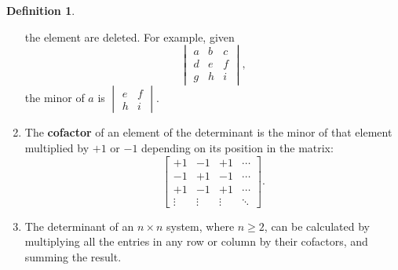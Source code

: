 \documentclass[a4paper,leqno]{article}
\numberwithin{equation}{section}
\theoremstyle{definition}
\newtheorem{defn}[equation]{Definition}
\theoremstyle{remark}
\newcommand{\df}[1]{\textbf{#1}}
\begin{document}
\begin{defn}
\begin{enumerate}
          the element are deleted. For example, given
          \begin{equation}
            \begin{vmatrix}
              a & b & c \\ d & e & f \\ g & h & i
            \end{vmatrix},
          \end{equation}
          the minor of $ a $ is $ \begin{vmatrix} e & f \\ h & i \end{vmatrix} $.
    \item The \df{cofactor} of an element of the determinant is the minor of that element multiplied by $ +1 $ or $ -1 $
          depending on its position in the matrix:
          \begin{equation}
            \begin{bmatrix}
              +1 & -1 & +1 & \cdots\\
              -1 & +1 & -1 & \cdots\\
              +1 & -1 & +1 & \cdots\\
                \vdots & \vdots & \vdots & \ddots
            \end{bmatrix}.
          \end{equation}
    \item The determinant of an $ n \times n $ system, where $ n \geq 2 $, can be calculated by multiplying all the entries in any row
          or column by their cofactors, and summing the result.
  \end{enumerate}
\end{defn}
\end{document}
